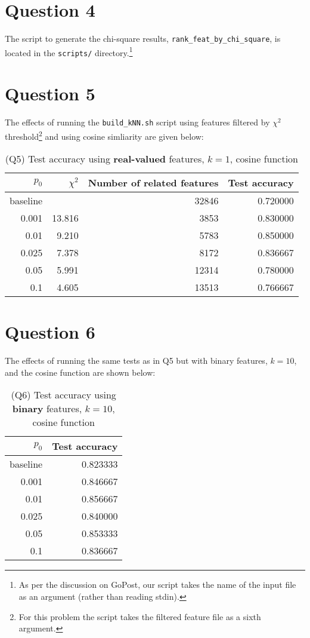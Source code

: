 \documentclass[oneside,justified,marginals=raggedouter]{tufte-handout}
\begin{document}
\section{Question 4}

The script to generate the chi-square results,
\texttt{rank\_feat\_by\_chi\_square}, is located in the \texttt{scripts/}
directory.\footnote{As per the discussion on GoPost, our script takes
the name of the input file as an argument (rather than reading stdin).}

\section{Question 5}

The effects of running the \texttt{build\_kNN.sh} script using
features filtered by $\chi^2$ threshold\footnote{For
this problem the script takes the filtered feature file as a sixth
argument.} and using cosine simliarity are given below:


\begin{table}
\begin{tabular}{@{}rrrr@{}}
\toprule
$p_0$ & $\chi^2$ & Number of related features & Test accuracy \\ \midrule
baseline &         & 32846 & 0.720000 \\
0.001    & 13.816  & 3853  & 0.830000 \\
0.01     & 9.210   & 5783  & 0.850000 \\
0.025    & 7.378   & 8172  & 0.836667 \\
0.05     & 5.991   & 12314 & 0.780000 \\
0.1      & 4.605   & 13513 & 0.766667 \\
\bottomrule
\end{tabular}
\caption{(Q5) Test accuracy using {\bf real-valued} features, {\bf $k=1$},
cosine function}
\end{table}


\section{Question 6}

The effects of running the same tests as in Q5 but with binary features,
$k=10$, and the cosine function are shown below:

\begin{table}
\begin{tabular}{@{}rr@{}}
\toprule
$p_0$ & Test accuracy \\ \midrule
baseline & 0.823333 \\
0.001    & 0.846667 \\
0.01     & 0.856667 \\
0.025    & 0.840000 \\
0.05     & 0.853333 \\
0.1      & 0.836667 \\
\bottomrule
\end{tabular}
\caption{(Q6) Test accuracy using {\bf binary} features, {\bf $k=10$},
cosine function}
\end{table}
\end{document}
